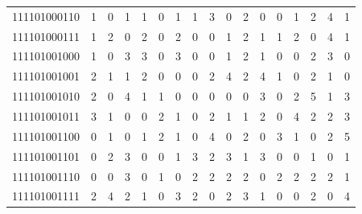 \documentclass[10pt,a4paper]{article}
\begin{document}
\begin{longtable}{ |c|c|c|c|c|c|c|c|c|c|c|c|c|c|c|c|c| }
    111101000110              & 1                            & 0                                & 1                            & 1                              & 0   & 1   & 1   & 3   & 0   & 2   & 0   & 0   & 1   & 2   & 4   & 1   \\
    111101000111              & 1                            & 2                                & 0                            & 2                              & 0   & 2   & 0   & 0   & 1   & 2   & 1   & 1   & 2   & 0   & 4   & 1   \\
    111101001000              & 1                            & 0                                & 3                            & 3                              & 0   & 3   & 0   & 0   & 1   & 2   & 1   & 0   & 0   & 2   & 3   & 0   \\
    111101001001              & 2                            & 1                                & 1                            & 2                              & 0   & 0   & 0   & 2   & 4   & 2   & 4   & 1   & 0   & 2   & 1   & 0   \\
    111101001010              & 2                            & 0                                & 4                            & 1                              & 1   & 0   & 0   & 0   & 0   & 0   & 3   & 0   & 2   & 5   & 1   & 3   \\
    111101001011              & 3                            & 1                                & 0                            & 0                              & 2   & 1   & 0   & 2   & 1   & 1   & 2   & 0   & 4   & 2   & 2   & 3   \\
    111101001100              & 0                            & 1                                & 0                            & 1                              & 2   & 1   & 0   & 4   & 0   & 2   & 0   & 3   & 1   & 0   & 2   & 5   \\
    111101001101              & 0                            & 2                                & 3                            & 0                              & 0   & 1   & 3   & 2   & 3   & 1   & 3   & 0   & 0   & 1   & 0   & 1   \\
    111101001110              & 0                            & 0                                & 3                            & 0                              & 1   & 0   & 2   & 2   & 2   & 2   & 0   & 2   & 2   & 2   & 2   & 1   \\
    111101001111              & 2                            & 4                                & 2                            & 1                              & 0   & 3   & 2   & 0   & 2   & 3   & 1   & 0   & 0   & 2   & 0   & 4   \\

\end{longtable}
\end{document}

